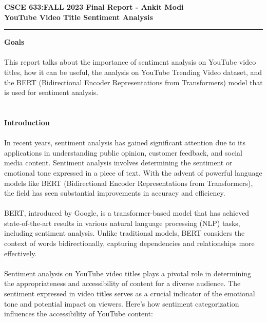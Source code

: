 \documentclass[12pt]{article}
\begin{document}
\begin{center}
  {\bf \LARGE CSCE 633:FALL 2023 Final Report - Ankit Modi}\\
  \vspace{0.2in}
  {\bf \LARGE YouTube Video Title Sentiment Analysis }
\end{center}
\hrule
\vspace{0.4in}
{\bf \large Goals}\\ \\
{This report talks about the importance of sentiment analysis on YouTube video titles, how it can be useful, the analysis on YouTube Trending Video dataset, and the BERT (Bidirectional Encoder Representations from Transformers) model that is used for sentiment analysis.}\\ \\ \\
{\bf \large Introduction}\\ \\
{In recent years, sentiment analysis has gained significant attention due to its applications in understanding public opinion, customer feedback, and social media content. Sentiment analysis involves determining the sentiment or emotional tone expressed in a piece of text. With the advent of powerful language models like BERT (Bidirectional Encoder Representations from Transformers), the field has seen substantial improvements in accuracy and efficiency.}\\ \\
{BERT, introduced by Google, is a transformer-based model that has achieved state-of-the-art results in various natural language processing (NLP) tasks, including sentiment analysis. Unlike traditional models, BERT considers the context of words bidirectionally, capturing dependencies and relationships more effectively.}\\ \\
{Sentiment analysis on YouTube video titles plays a pivotal role in determining the appropriateness and accessibility of content for a diverse audience. The sentiment expressed in video titles serves as a crucial indicator of the emotional tone and potential impact on viewers. Here's how sentiment categorization influences the accessibility of YouTube content:} 
\end{document}
